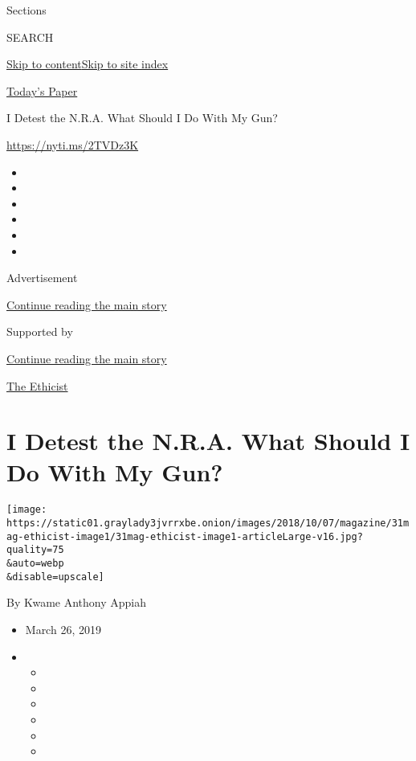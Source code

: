 Sections

SEARCH

\protect\hyperlink{site-content}{Skip to
content}\protect\hyperlink{site-index}{Skip to site index}

\href{https://myaccount.nytimes3xbfgragh.onion/auth/login?response_type=cookie\&client_id=vi}{}

\href{https://www.nytimes3xbfgragh.onion/section/todayspaper}{Today's
Paper}

I Detest the N.R.A. What Should I Do With My Gun?

\url{https://nyti.ms/2TVDz3K}

\begin{itemize}
\item
\item
\item
\item
\item
\item
\end{itemize}

Advertisement

\protect\hyperlink{after-top}{Continue reading the main story}

Supported by

\protect\hyperlink{after-sponsor}{Continue reading the main story}

\href{/column/the-ethicist}{The Ethicist}

\hypertarget{i-detest-the-nra-what-should-i-do-with-my-gun}{%
\section{I Detest the N.R.A. What Should I Do With My
Gun?}\label{i-detest-the-nra-what-should-i-do-with-my-gun}}

\texttt{[image: https://static01.graylady3jvrrxbe.onion/images/2018/10/07/magazine/31mag-ethicist-image1/31mag-ethicist-image1-articleLarge-v16.jpg?quality=75\\\&auto=webp\\\&disable=upscale]}

By Kwame Anthony Appiah

\begin{itemize}
\item
  March 26, 2019
\item
  \begin{itemize}
  \item
  \item
  \item
  \item
  \item
  \item
  \end{itemize}
\end{itemize}

